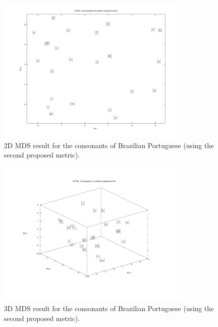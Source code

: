 \begin{figure}[h!]
\centering
\includegraphics[width=0.85\textwidth]{images/mds_consonantsPT_metric2.pdf}
\caption{2D MDS result for the consonants of Brazilian Portuguese (using the second proposed metric).}
\label{fig:mds2DconsonantsM2}
\end{figure}

\begin{figure}[h!]
\centering
\includegraphics[width=0.85\textwidth]{images/mds_consonantsPT_3D_metric2.pdf}
\caption{3D MDS result for the consonants of Brazilian Portuguese (using the second proposed metric).}
\label{fig:mds3DconsonantsM2}
\end{figure}

